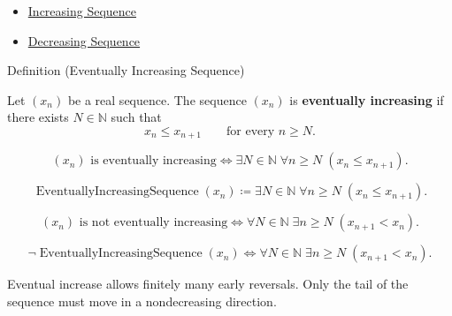 \begin{dependencies}
\begin{itemize}
  \item \hyperref[def:increasing-sequence]{Increasing Sequence}
  \item \hyperref[def:decreasing-sequence]{Decreasing Sequence}
\end{itemize}
\end{dependencies}


\begin{definitionbox}{Definition (Eventually Increasing Sequence)}
\begin{definition}
\label{def:eventually-increasing-sequence}
Let $(x_n)$ be a real sequence. The sequence $(x_n)$ is
\textbf{eventually increasing} if there exists $N\in\mathbb{N}$ such that
\[
  x_n \le x_{n+1}
  \qquad
  \text{for every } n\ge N.
\]
\end{definition}
\end{definitionbox}

\begin{remark*}
\[
(x_n)\text{ is eventually increasing}
\Longleftrightarrow
\exists N\in\mathbb{N}\;\forall n\ge N\;(x_n\le x_{n+1}).
\]
\end{remark*}

\begin{remark*}
\[
\operatorname{EventuallyIncreasingSequence}(x_n)
\coloneqq
\exists N\in\mathbb{N}\;\forall n\ge N\;(x_n\le x_{n+1}).
\]
\end{remark*}

\begin{remark*}
\[
(x_n)\text{ is not eventually increasing}
\Longleftrightarrow
\forall N\in\mathbb{N}\;\exists n\ge N\;(x_{n+1}<x_n).
\]
\end{remark*}

\begin{remark*}
\[
\neg\operatorname{EventuallyIncreasingSequence}(x_n)
\Longleftrightarrow
\forall N\in\mathbb{N}\;\exists n\ge N\;(x_{n+1}<x_n).
\]
\end{remark*}

\begin{remark*}[Interpretation]
Eventual increase allows finitely many early reversals. Only the tail of the
sequence must move in a nondecreasing direction.
\end{remark*}

